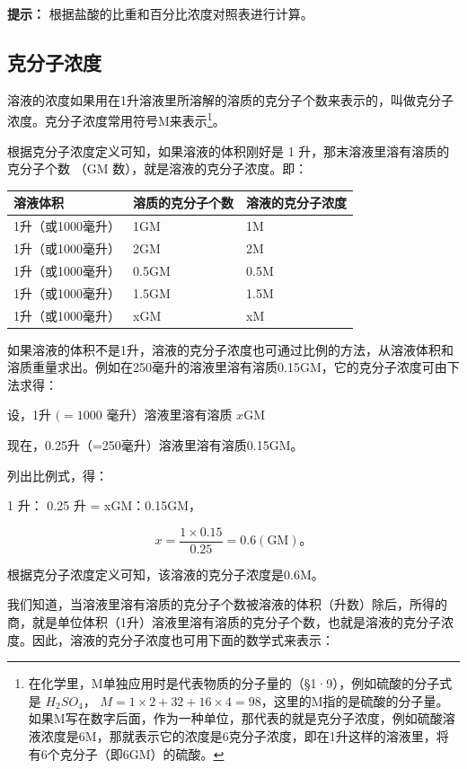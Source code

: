 \begin{shulihuadef}
\textbf{提示：} 根据盐酸的比重和百分比浓度对照表进行计算。
\end{shulihuadef}

\subsection{克分子浓度}

溶液的浓度如果用在1升溶液里所溶解的溶质的克分子个数来表示的，叫做克分子浓度。克分子浓度常用符号M来表示\footnote{在化学里，M单独应用时是代表物质的分子量的（§1·9），例如硫酸的分子式是
  \(H_{2}SO_{4}\)，
  \(M=1\times2+32+16\times4=98\)，这里的M指的是硫酸的分子量。如果M写在数字后面，作为一种单位，那代表的就是克分子浓度，例如硫酸溶液浓度是6M，那就表示它的浓度是6克分子浓度，即在1升这样的溶液里，将有6个克分子（即6GM）的硫酸。}。

根据克分子浓度定义可知，如果溶液的体积刚好是 1
升，那末溶液里溶有溶质的克分子个数 （GM 数），就是溶液的克分子浓度。即：

{\def\LTcaptype{none} %
\begin{longtable}[]{@{}lll@{}}
\toprule\noalign{}
溶液体积 & 溶质的克分子个数 & 溶液的克分子浓度 \\
\midrule\noalign{}
\endhead
\bottomrule\noalign{}
\endlastfoot
1升（或1000毫升） & 1GM & 1M \\
1升（或1000毫升） & 2GM & 2M \\
1升（或1000毫升） & 0.5GM & 0.5M \\
1升（或1000毫升） & 1.5GM & 1.5M \\
1升（或1000毫升） & xGM & xM \\
\end{longtable}
}

如果溶液的体积不是1升，溶液的克分子浓度也可通过比例的方法，从溶液体积和溶质重量求出。例如在250毫升的溶液里溶有溶质0.15GM，它的克分子浓度可由下法求得：

设，1升 \((=1000\) 毫升）溶液里溶有溶质 \(x\mathrm{GM}\)

现在，0.25升（=250毫升）溶液里溶有溶质0.15GM。

列出比例式，得：

1 升： 0.25 升 = xGM：0.15GM，

\[
x = \frac {1 \times 0.15}{0.25} = 0.6 (\mathrm{GM})\text{。}
\]

根据克分子浓度定义可知，该溶液的克分子浓度是0.6M。

我们知道，当溶液里溶有溶质的克分子个数被溶液的体积（升数）除后，所得的商，就是单位体积（1升）溶液里溶有溶质的克分子个数，也就是溶液的克分子浓度。因此，溶液的克分子浓度也可用下面的数学式来表示：

